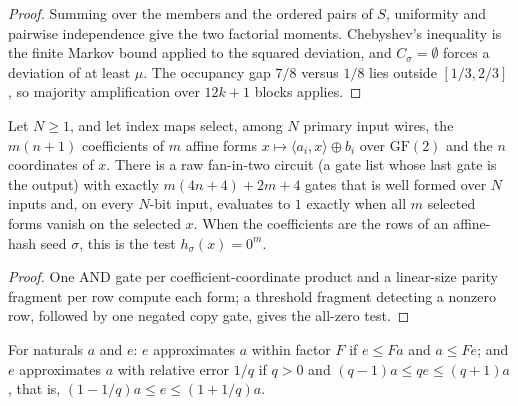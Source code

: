 \begin{proof}
  \leanok
  Summing over the members and the ordered pairs of $S$, uniformity and
  pairwise independence give the two factorial moments. Chebyshev's inequality
  is the finite Markov bound applied to the squared deviation, and
  $C_\sigma = \emptyset$ forces a deviation of at least $\mu$. The occupancy
  gap $7/8$ versus $1/8$ lies outside $[1/3, 2/3]$, so majority amplification
  over $12k + 1$ blocks applies.
\end{proof}

\begin{lemma}
  \label{lem:randomness-affine-zero-circuit}
  \leanok
  Let $N \ge 1$, and let index maps select, among $N$ primary input wires, the
  $m(n + 1)$ coefficients of $m$ affine forms
  $x \mapsto \langle a_i, x \rangle \oplus b_i$ over $\mathrm{GF}(2)$ and the
  $n$ coordinates of $x$. There is a raw fan-in-two circuit (a gate list whose
  last gate is the output) with exactly $m(4n + 4) + 2m + 4$ gates that is well
  formed over $N$ inputs and, on every $N$-bit input, evaluates to $1$ exactly
  when all $m$ selected forms vanish on the selected $x$. When the coefficients
  are the rows of an affine-hash seed $\sigma$, this is the test
  $h_\sigma(x) = 0^m$.
\end{lemma}
\begin{proof}
  \leanok
  One AND gate per coefficient-coordinate product and a linear-size parity
  fragment per row compute each form; a threshold fragment detecting a nonzero
  row, followed by one negated copy gate, gives the all-zero test.
\end{proof}

\begin{definition}
  \label{def:randomness-approx}
  \leanok
  For naturals $a$ and $e$: $e$ approximates $a$ within factor $F$ if
  $e \le Fa$ and $a \le Fe$; and $e$ approximates $a$ with relative error
  $1/q$ if $q > 0$ and $(q - 1)a \le qe \le (q + 1)a$, that is,
  $(1 - 1/q)a \le e \le (1 + 1/q)a$.
\end{definition}

